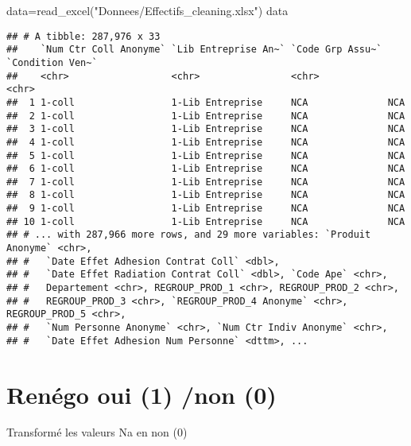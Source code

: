 \documentclass[
]{article}
\newenvironment{Shaded}{\begin{snugshade}}{\end{snugshade}}
\newcommand{\FunctionTok}[1]{\textcolor[rgb]{0.00,0.00,0.00}{#1}}
\newcommand{\NormalTok}[1]{#1}
\newcommand{\OtherTok}[1]{\textcolor[rgb]{0.56,0.35,0.01}{#1}}
\newcommand{\StringTok}[1]{\textcolor[rgb]{0.31,0.60,0.02}{#1}}
\begin{document}
\begin{Shaded}
\begin{Highlighting}[]
\NormalTok{data}\OtherTok{=}\FunctionTok{read\_excel}\NormalTok{(}\StringTok{"Donnees/Effectifs\_cleaning.xlsx"}\NormalTok{)}
\NormalTok{data}
\end{Highlighting}
\end{Shaded}

\begin{verbatim}
## # A tibble: 287,976 x 33
##    `Num Ctr Coll Anonyme` `Lib Entreprise An~` `Code Grp Assu~` `Condition Ven~`
##    <chr>                  <chr>                <chr>            <chr>           
##  1 1-coll                 1-Lib Entreprise     NCA              NCA             
##  2 1-coll                 1-Lib Entreprise     NCA              NCA             
##  3 1-coll                 1-Lib Entreprise     NCA              NCA             
##  4 1-coll                 1-Lib Entreprise     NCA              NCA             
##  5 1-coll                 1-Lib Entreprise     NCA              NCA             
##  6 1-coll                 1-Lib Entreprise     NCA              NCA             
##  7 1-coll                 1-Lib Entreprise     NCA              NCA             
##  8 1-coll                 1-Lib Entreprise     NCA              NCA             
##  9 1-coll                 1-Lib Entreprise     NCA              NCA             
## 10 1-coll                 1-Lib Entreprise     NCA              NCA             
## # ... with 287,966 more rows, and 29 more variables: `Produit Anonyme` <chr>,
## #   `Date Effet Adhesion Contrat Coll` <dbl>,
## #   `Date Effet Radiation Contrat Coll` <dbl>, `Code Ape` <chr>,
## #   Departement <chr>, REGROUP_PROD_1 <chr>, REGROUP_PROD_2 <chr>,
## #   REGROUP_PROD_3 <chr>, `REGROUP_PROD_4 Anonyme` <chr>, REGROUP_PROD_5 <chr>,
## #   `Num Personne Anonyme` <chr>, `Num Ctr Indiv Anonyme` <chr>,
## #   `Date Effet Adhesion Num Personne` <dttm>, ...
\end{verbatim}

\hypertarget{renuxe9go-oui-1-non-0}{%
\section{Renégo oui (1) /non (0)}\label{renuxe9go-oui-1-non-0}}

Transformé les valeurs Na en non (0)
\end{document}
